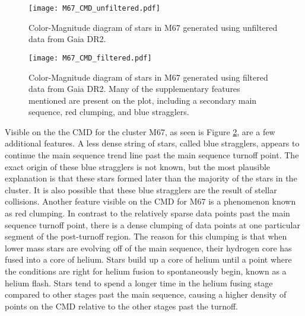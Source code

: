 \documentclass[aps,prb,twocolumn,groupedaddress,nofootinbib,floatfix]{revtex4-1}
\begin{document}
\begin{figure}[!h]
	\centering
      \texttt{[image: M67\_CMD\_unfiltered.pdf]}
	\caption{Color-Magnitude diagram of stars in M67 generated using unfiltered data from Gaia DR2.}
	\label{fig:M67_CMD_unfiltered}
\end{figure}

\begin{figure}[!h]
	\centering
      \texttt{[image: M67\_CMD\_filtered.pdf]}
	\caption{Color-Magnitude diagram of stars in M67 generated using filtered data from Gaia DR2. Many of the supplementary features mentioned are present on the plot, including a secondary main sequence, red clumping, and blue stragglers.}
	\label{fig:M67_CMD_filtered}
\end{figure}

Visible on the the CMD for the cluster M67, as seen is Figure \ref{fig:M67_CMD_filtered}, are a few additional features. A less dense string of stars, called blue stragglers, appears to continue the main sequence trend line past the main sequence turnoff point. The exact origin of these blue stragglers is not known, but the most plausible explanation is that these stars formed later than the majority of the stars in the cluster. It is also possible that these blue stragglers are the result of stellar collisions. Another feature visible on the CMD for M67 is a phenomenon known as red clumping. In contrast to the relatively sparse data points past the main sequence turnoff point, there is a dense clumping of data points at one particular segment of the post-turnoff region. The reason for this clumping is that when lower mass stars are evolving off of the main sequence, their hydrogen core has fused into a core of helium. Stars build up a core of helium until a point where the conditions are right for helium fusion to spontaneously begin, known as a helium flash. Stars tend to spend a longer time in the helium fusing stage compared to other stages past the main sequence, causing a higher density of points on the CMD relative to the other stages past the turnoff.
\end{document}
